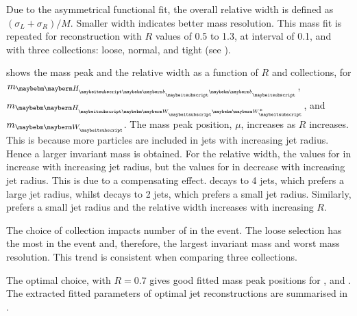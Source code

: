 
Due to the asymmetrical functional fit, the overall relative width is defined as $\left(\sigma_L  + \sigma_R\right)/M$. Smaller width indicates better mass resolution. This mass fit is repeated for reconstruction with $R$ values of 0.5 to 1.3, at interval of 0.1, and with three \PFO collections: loose, normal, and tight (see ).

 shows the mass peak and the relative width as a function of $R$ and \PFO collections, for $m_{\Hbb}$, $m_{\HWW}$, and $m_{\PW}$. The mass peak position, $\mu$, increases as $R$ increases. This is because more particles are included in jets with increasing jet radius. Hence a larger invariant mass is obtained. For the relative width, the values for \Hbb in  increase with increasing jet radius, but the values for \HWW  in  decrease  with increasing jet radius. This is due to a compensating effect. \HWW decays to 4 jets, which prefers a large jet radius, whilst \Hbb decays to 2 jets, which prefers a small jet radius. Similarly, \PW prefers a small jet radius and the relative width increases with increasing $R$.

The choice of \PFO collection impacts number of \PFOs in the event. The loose \PFO selection has the most \PFOs in the event and, therefore, the largest invariant mass and worst mass resolution. This trend is consistent when comparing three \PFO collections.

The optimal choice, \normalPFO with $R = 0.7$  gives good fitted mass peak positions for \Hbb, \HWW and \PW. The extracted fitted parameters of optimal jet reconstructions are summarised in .


